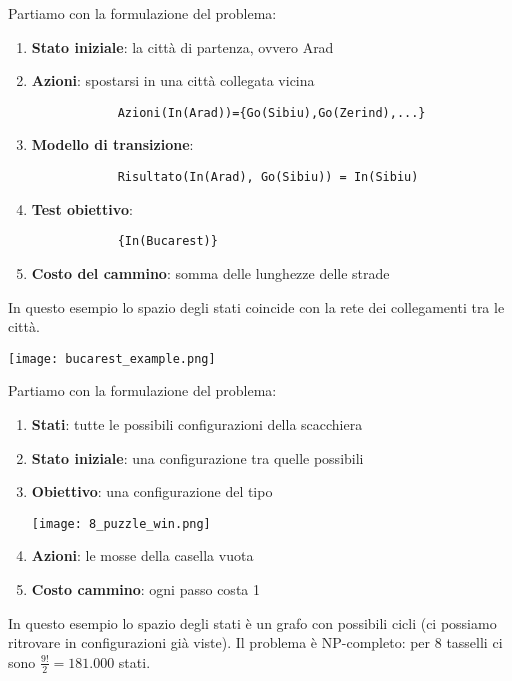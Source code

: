 \begin{example}
	Partiamo con la formulazione del problema:
	\begin{enumerate}
		\item \textbf{Stato iniziale}: la città di partenza, ovvero Arad
		\item \textbf{Azioni}: spostarsi in una città collegata vicina
		\begin{lstlisting}
			Azioni(In(Arad))={Go(Sibiu),Go(Zerind),...}
		\end{lstlisting}
		\item \textbf{Modello di transizione}: 
		\begin{lstlisting}
			Risultato(In(Arad), Go(Sibiu)) = In(Sibiu)
		\end{lstlisting}
		\item \textbf{Test obiettivo}:
		\begin{lstlisting}
			{In(Bucarest)}
		\end{lstlisting}
		\item \textbf{Costo del cammino}: somma delle lunghezze delle strade
	\end{enumerate}
	In questo esempio lo spazio degli stati coincide con la rete dei collegamenti tra le città.
	\begin{center}
		\texttt{[image: bucarest\_example.png]}
	\end{center}
\end{example}

\begin{example}
	Partiamo con la formulazione del problema:
	\begin{enumerate}
		\item \textbf{Stati}: tutte le possibili configurazioni della scacchiera
		\item \textbf{Stato iniziale}: una configurazione tra quelle possibili
		\item \textbf{Obiettivo}: una configurazione del tipo
		\begin{center}
			\texttt{[image: 8\_puzzle\_win.png]}
		\end{center}
		\item \textbf{Azioni}: le mosse della casella vuota
		\item \textbf{Costo cammino}: ogni passo costa 1
	\end{enumerate}
	In questo esempio lo spazio degli stati è un grafo con possibili cicli (ci possiamo ritrovare in configurazioni già viste). Il problema è NP-completo: per 8 tasselli ci sono $\frac{9!}{2}=181.000$ stati.
\end{example}


